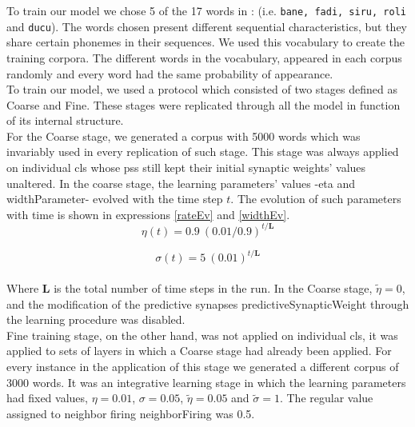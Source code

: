 \documentclass[11pt,a4paper]{article}
\begin{document}
To train our model we chose 5 of the 17 words in \cite{tabullo13}:
(i.e. \texttt{bane, fadi, siru, roli} and \texttt{ducu}).
The words chosen present different sequential characteristics,
but they share certain phonemes in their sequences.
We used this vocabulary to create the training corpora.
The different words in the vocabulary, appeared in each corpus randomly and every word
had the same probability of appearance.\\

To train our model, we used a protocol which consisted of two stages defined as
Coarse and Fine.
These stages were replicated through all the model in function of its internal structure.\\

For the Coarse stage, we generated a corpus with 5000 words
which was invariably used in every replication of such stage.
This stage was always applied on individual \ac{cl}s whose \ac{ps}s
still kept their initial synaptic weights' values unaltered.
In the coarse stage, the learning parameters' values
-\ac{eta} and \ac{widthParameter}- evolved with the time step $t$.
The evolution of such parameters with time is shown in expressions
\ref{rateEv} and \ref{widthEv}.\\

\begin{equation} \label{rateEv}
\eta(t) = 0.9 ~ (0.01/0.9)^{t/\boldsymbol{L}}
\end{equation}

\begin{equation} \label{widthEv}
\sigma(t) = 5 ~ (0.01)^{t/\boldsymbol{L}}
\end{equation}\\

Where $\boldsymbol{L}$ is the total number of time steps in the run.
In the Coarse stage, $\tilde{\eta} = 0$, and the modification of the
predictive synapses \ac{predictiveSynapticWeight} through the
learning procedure was disabled.\\

Fine training stage, on the other hand, was not applied on individual \ac{cl}s,
it was applied to sets of layers in which a Coarse stage had already been applied.
For every instance in the application of this stage we generated a
different corpus of 3000 words.
It was an integrative learning stage in which the learning parameters
had fixed values, $\eta = 0.01$, $\sigma = 0.05$, $\tilde{\eta} = 0.05$ and
$\tilde{\sigma} = 1$.
The regular value assigned to neighbor firing \ac{neighborFiring} was 0.5.\\
\end{document}
